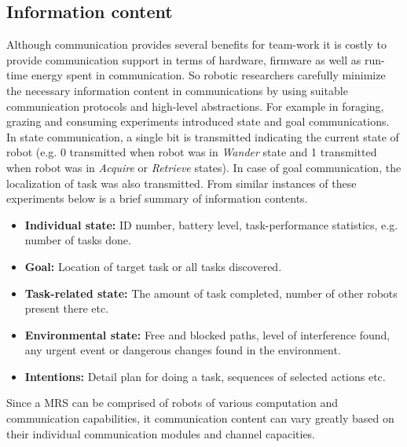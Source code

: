 \subsection{Information content}
Although communication provides several benefits for team-work it is costly to provide communication support in terms of hardware, firmware as well as run-time energy spent in communication. So robotic researchers carefully minimize the necessary information content in communications by using suitable communication protocols and high-level abstractions. For example in foraging, grazing and consuming experiments  introduced state and goal communications. In state communication, a single bit is transmitted indicating the current state of robot (e.g. 0 transmitted when robot was in {\em Wander} state and 1 transmitted when robot was in {\em Acquire} or {\em Retrieve} states). In case of goal communication, the localization of task was also transmitted. From similar instances of these experiments below is a brief summary of information contents.
\begin{itemize}
\item \textbf{Individual state:} ID number, battery level, task-performance statistics, e.g. number of tasks done.
\item \textbf{Goal:} Location of target task or all tasks discovered.
\item \textbf{Task-related state:} The amount of task completed, number of other robots present there etc.
\item \textbf{Environmental state:} Free and blocked paths, level of interference found, any urgent event or dangerous changes found in the environment.
\item \textbf{Intentions:} Detail plan for doing a task, sequences of selected actions etc.
\end{itemize}
 Since a MRS can be comprised of robots of various computation and communication capabilities, it communication content can vary greatly based on their individual communication modules and channel capacities.
